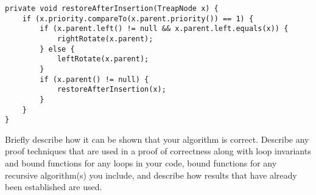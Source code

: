 \documentclass[12pt]{article}
\newenvironment{problem}[2][Problem]{\begin{trivlist}
\item[\hskip \labelsep {\bfseries #1}\hskip \labelsep {\bfseries #2.}]}{\end{trivlist}}
\begin{document}
\begin{problem}{3}
\end{problem}

\begin{verbatim}
private void restoreAfterInsertion(TreapNode x) {
    if (x.priority.compareTo(x.parent.priority()) == 1) {
        if (x.parent.left() != null && x.parent.left.equals(x)) {
            rightRotate(x.parent);
        } else {
            leftRotate(x.parent);
        }
        if (x.parent() != null) {
            restoreAfterInsertion(x);
        }
    }
}
\end{verbatim}

\begin{problem}{4}
    Briefly describe how it can be shown that your algorithm is correct. Describe any proof techniques that are used in a proof of correctness along with loop invariants and bound functions for any loops in your code, bound functions for any recursive algorithm(s) you include, and describe how results that have already been established are used.
\end{problem}
\end{document}
